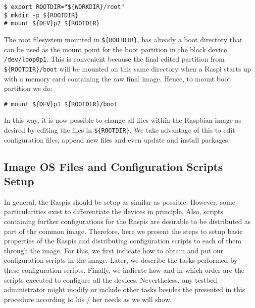 \begin{lstlisting}[]
$ export ROOTDIR="${WORKDIR}/root"
$ mkdir -p ${ROOTDIR}
# mount ${DEV}p2 ${ROOTDIR}
\end{lstlisting}
\FloatBarrier
\vspace{-5mm}

The root filesystem mounted in \texttt{\$\{ROOTDIR\}}, has already a boot
directory that can be used as the mount point for the boot partition
in the block device \texttt{/dev/loop0p1}. This is convenient because
the final edited partition from \texttt{\$\{ROOTDIR\}/boot} will be mounted on
this same directory when a \ac{Raspi} starts up with a memory card
containing the raw final image. Hence, to mount boot partition we do:

\begin{lstlisting}[]
# mount ${DEV}p1 ${ROOTDIR}/boot
\end{lstlisting}
\FloatBarrier
\vspace{-5mm}

In this way, it is now possible to change all files within the Raspbian
image as desired by editing the files in \texttt{\$\{ROOTDIR\}}. We take
advantage of this to edit configuration files, append new files and even
update and install packages.

\subsection{Image OS Files and Configuration Scripts Setup}
In general, the \ac{Raspi}s should be setup as similar as possible. However,
some particularities exist to differentiate the devices in principle. Also,
scripts containing further configurations for the \ac{Raspi}s are desirable
to be distributed as part of the common image. Therefore, here we present
the steps to setup basic properties of the \ac{Raspi}s and distributing
configuration scripts to each of them through the image. For this, we first
indicate how to obtain and put our configuration scripts in the image. Later,
we describe the tasks performed by these configuration scripts. Finally, we
indicate how and in which order are the scripts executed to configure all the
devices. Nevertheless, any testbed administrator might modify or include other
tasks besides the presented in this procedure according to his / her needs
as we will show.

